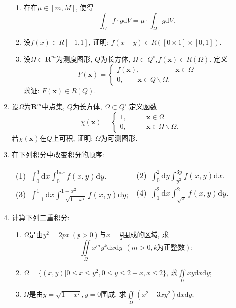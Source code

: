 \begin{enumerate}
\begin{enumerate}
	\item 存在$\mu\in [m,M]$, 使得
	$$ \displaystyle{\int_{\Omega}f\cdot g\mathrm{d}V=\mu\cdot \int_{\Omega}g\mathrm{d}V}.$$
	\item 设$f(x)\in R[-1,1]$, 证明: $f(x-y)\in R([0\times1]\times[0,1])$.
	\item 设$\Omega \subset \bm{R}^m$为测度图形, $Q$为长方体, $\Omega \subset Q^\circ,f(\bm{x})\in R(\Omega)$. 定义$$
	F(\bm{x}) = \begin{cases}
	f(\bm{x}),\qquad &\bm{x}\in \Omega\\
	0,\qquad \bm{x}\in Q\backslash \Omega.
	\end{cases}$$
	求证: $F(\bm{x})\in R(Q)$.
	
\end{enumerate}
\item 设$\Omega$为$\bm{R}^m$中点集, $Q$为长方体, $\Omega \subset Q^\circ$.定义函数
$$ \chi(\bm{x})=\begin{cases}
1,\qquad &\bm{x} \in \Omega\\
0,\qquad &\bm{x} \in \Omega\backslash \Omega.
\end{cases}$$
若$\chi(\bm{x})$在$Q$上可积, 证明: $\Omega$为可测图形.
\item 在下列积分中改变积分的顺序:
\begin{table}[H]
	\begin{tabular}{ll}
		\qquad(1)\ $\displaystyle{\int_{0}^{3}\mathrm{d}x\int_{0}^{\mathrm{ln}x}f(x,y)\mathrm{d}y}$.\qquad \qquad \qquad \qquad \qquad &(2)\ $\displaystyle{\int_{0}^{2}\mathrm{d}y\int_{y^2}^{3y}f(x,y)\mathrm{d}x}$.\\
		\qquad(3)\ $\displaystyle{\int_{-1}^{1}\mathrm{d}x\int_{-\sqrt{1-x^2}}^{1-x^2}f(x,y)\mathrm{d}y}$;\qquad \qquad \qquad \qquad \qquad &(4)\ $\displaystyle{\int_{1}^{2}\mathrm{d}x\int_{\sqrt{x}}^{2}f(x,y)\mathrm{d}y}$.
	\end{tabular}
\end{table}
\item 计算下列二重积分:
\begin{enumerate}
	\item $\Omega$是由$y^2=2px\ (p>0)$与$x=\frac{p}{2}$围成的区域, 求
	$$ \displaystyle{\underset{\Omega}{\iint }x^my^k\mathrm{d}x\mathrm{d}y}\ \ (m>0,k\text{为正整数});$$
	\item $\Omega=\{(x,y)|0\le x\le y^2,0\le y \le 2+x,x\le 2\}$, 求$\displaystyle{\underset{\Omega}{\iint}xy\mathrm{d}x\mathrm{d}y}$;
	\item $\Omega$是由$y=\sqrt{1-x^2},y=0$围成, 求$\displaystyle{\underset{\Omega}{\iint}(x^2+3xy^2)\mathrm{d}x\mathrm{d}y}$;

\end{enumerate}
\end{enumerate}
